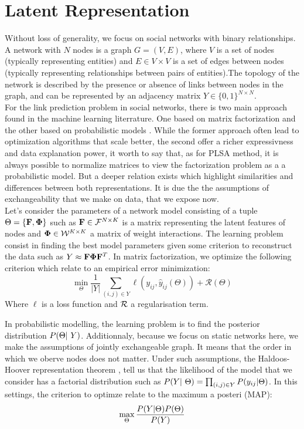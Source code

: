 \section{Latent Representation}
\label{sec:background}
Without loss of generality, we focus on social networks with binary relationships. A network with $N$ nodes is a graph $G = (V,E)$, where $V$ is a set of nodes (typically representing entities) and $E \in V \times V$ is a set of edges between nodes (typically representing relationships between pairs of entities).The topology of the network is described by the presence or absence of links between nodes in the graph, and can be represented by an adjacency matrix $Y \in \{0,1\}^{N\times N}$.\\

For the link prediction problem in social networks, there is two main approach found in the machine learning literrature. One based on matrix factorization \cite{menon2011link} and the other based on probabilistic models \cite{goldenberg2010survey}. While the former approach often lead to optimization algorithms that scale better, the second offer a richer expressivness and data explanation power, it worth to say that, as for PLSA method, it is always possible to normalize matrices to view the factorization problem as a a probabilistic model. But a deeper relation exists which highlight similarities and differences between both representations. It is due the the assumptions of exchangeability that we make on data, that we expose now.\\

Let's consider the parameters of a network model consisting of a tuple $\Theta = \{ \mathbf{F} , \mathbf{\Phi}\}$ such as $\mathbf{F} \in \mathcal{F}^{N\times K}$ is a matrix representing the latent features of nodes and $\mathbf{\Phi} \in \mathcal{W}^{K\times K}$ a matrix of weight interactions. The learning problem consist in finding the best model parameters given some criterion to reconstruct the data such as $Y \approx \mathbf{F}\mathbf{\Phi}\mathbf{F}^T$. In matrix factorization, we optimize the following criterion which relate to an empirical error minimization:
\begin{displaymath}
    \min\limits_{\Theta} \frac{1}{|Y|} \sum_{(i,j) \in Y} \ell(y_{ij}, \hat y_{ij}(\Theta)) + \mathcal{R}(\Theta)
\end{displaymath}
Where $\ell$ is a loss function and $\cal R$ a regularisation term.

In probabilistic modelling, the learning problem is to find the posterior distribution $\p(\Theta | Y)$. Additionnaly, because we focus on static networks here, we make the assumptions of jointly exchangeable graph. It means that the order in which we oberve nodes does not matter. Under such assumptions, the Haldoos-Hoover representation theorem \cite{orbanz2015bayesian}, tell us that the likelihood of the model that we consider has a factorial distribution such as $\p(Y | \Theta) = \prod_{(i,j) \in Y} \p(y_{ij}| \Theta)$. In this settings, the criterion to optimze relate to the maximum a posteri (MAP): 
\begin{displaymath}
    \max\limits_{\Theta}  \frac{P(Y | \Theta) P(\Theta)}{P(Y)}
\end{displaymath}

